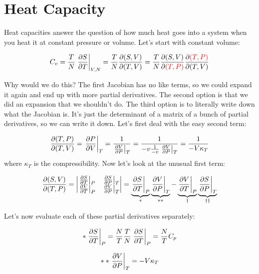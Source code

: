 \documentclass[a4paper,twoside,master.tex]{subfiles}
\begin{document}

\section{Heat Capacity}
\label{sec:heat_capacity}

Heat capacities answer the question of how much heat goes into a system when you heat it at constant pressure or volume. Let's start with constant volume:

\begin{equation}
    C_v = \frac{T}{N} \eval{\pdv{S}{T}}_{V,N} = \frac{T}{N} \pdv{(S,V)}{(T,V)} = \frac{T}{N} \pdv{(S,V)}{\color{red}(T,P)\color{black}} \pdv{\color{red}(T,P)\color{black}}{(T,V)}
\end{equation}

Why would we do this? The first Jacobian has no like terms, so we could expand it again and end up with more partial derivatives. The second option is that we did an expansion that we shouldn't do. The third option is to literally write down what the Jacobian is. It's just the determinant of a matrix of a bunch of partial derivatives, so we can write it down. Let's first deal with the easy second term:

\begin{equation}
    \pdv{(T,P)}{(T,V)} = \eval{\pdv{P}{V}}_{T} = \frac{1}{\eval{\pdv{V}{P}}_{T}} = \frac{1}{-v \frac{1}{-v} \eval{\pdv{V}{P}}_{T}} = \frac{1}{-V \kappa_T}
\end{equation}
where $ \kappa_T $ is the compressibility. Now let's look at the unusual first term:

\begin{equation}
    \pdv{(S,V)}{(T,P)} = \mqty| \eval{\pdv{S}{T}}_{P} & \eval{\pdv{S}{P}}_{T} \\ \eval{\pdv{V}{T}}_{P} & \eval{\pdv{V}{P}}_{T} | = \underbrace{\eval{\pdv{S}{T}}_{P}}_{\ast} \underbrace{\eval{\pdv{V}{P}}_{T}}_{\ast\ast} - \underbrace{\eval{\pdv{V}{T}}_{P}}_{\dagger} \underbrace{\eval{\pdv{S}{P}}_{T}}_{\dagger\dagger}
\end{equation}

Let's now evaluate each of these partial derivatives separately:

\begin{equation}
    \ast \eval{\pdv{S}{T}}_{P} = \frac{N}{T} \frac{T}{N} \eval{\pdv{S}{T}}_{P} = \frac{N}{T} C_p
\end{equation}

\begin{equation}
    \ast\ast \eval{\pdv{V}{P}}_{T} = -V \kappa_T
\end{equation}
\end{document}

